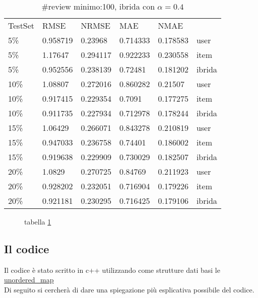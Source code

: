 \documentclass[12pt]{article}
\begin{document}
\begin{table}[H]
\caption{\#review minimo:100, ibrida con $\alpha= 0.4$}
\begin{tabular}{llllll}
TestSet & RMSE  & NRMSE & MAE & NMAE &  \\ 
5\% & 0.958719 & 0.23968 & 0.714333  & 0.178583 & user\\
5\% & 1.17647 & 0.294117 & 0.922233  & 0.230558 & item\\ \hline
5\% & 0.952556 & 0.238139 & 0.72481& 0.181202 & ibrida \\ \hline
10\% & 1.08807 & 0.272016 & 0.860282 & 0.21507& user \\
10\% & 0.917415 & 0.229354 & 0.7091 & 0.177275& item \\ \hline
10\% & 0.911735 & 0.227934 & 0.712978 & 0.178244& ibrida \\ \hline
15\% & 1.06429& 0.266071& 0.843278& 0.210819 & user \\ 
15\% & 0.947033& 0.236758& 0.74401& 0.186002 & item \\ \hline
15\% & 0.919638& 0.229909& 0.730029& 0.182507 & ibrida \\ \hline
20\% & 1.0829& 0.270725& 0.84769& 0.211923 & user\\
20\% & 0.928202& 0.232051& 0.716904& 0.179226 & item\\ \hline
20\% & 0.921181& 0.230295& 0.716425& 0.179106 & ibrida\\
\end{tabular}
\label{table:minimo100-sceltaCasuale}
\end{table}

\begin{figure}[H]
\caption{tabella \ref{table:minimo100-sceltaCasuale}}
\end{figure}
\newpage
\subsection*{Il codice}
Il codice è stato scritto in c++ utilizzando come strutture dati basi le \\
\href{http://www.cplusplus.com/reference/unordered_map/unordered_map/}{unordered\_map}\\
Di seguito si cercherà di dare una spiegazione più esplicativa possibile del codice.\\
\end{document}
